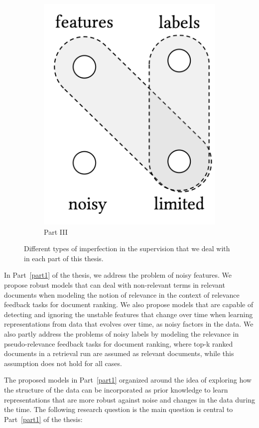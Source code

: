 \begin{figure}[t]
\begin{subfigure}[b]{0.32\textwidth}
    \centering
        \includegraphics[width=0.55\linewidth]{01-introduction/figs_and_tables/fig_p3.png}
        \caption{\label{fig:p3}Part III}
    \end{subfigure}
\caption{\label{fig:thesis_parts}Different types of imperfection in the supervision that we deal with in each part of this thesis.}
\end{figure}

In Part~\ref{part1} of the thesis, we address the problem of noisy features. We propose robust models that can deal with non-relevant terms in relevant documents when modeling the notion of relevance in the context of relevance feedback tasks for document ranking. We also propose models that are capable of detecting and ignoring the unstable features that change over time when learning representations from data that evolves over time, as noisy factors in the data. We also partly address the problems of noisy labels by modeling the relevance in pseudo-relevance feedback tasks for document ranking, where top-k ranked documents in a retrieval run are assumed as relevant documents, while this assumption does not hold for all cases.

The proposed models in Part~\ref{part1} organized around the idea of exploring how the structure of the data can be incorporated as prior knowledge to learn representations that are more robust against noise and changes in the data during the time. 
The following research question is the main question is central to Part~\ref{part1} of the thesis:


